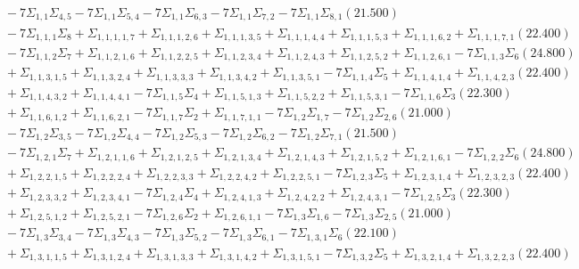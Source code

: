 \documentclass[12pt]{article}
\begin{document}
\begin{landscape}
\begin{align*}
		&\quad\quad -7\Sigma_{1,1}\Sigma_{4,5}-7\Sigma_{1,1}\Sigma_{5,4}-7\Sigma_{1,1}\Sigma_{6,3}-7\Sigma_{1,1}\Sigma_{7,2}-7\Sigma_{1,1}\Sigma_{8,1}(21.500) \\ 
		&\quad\quad -7\Sigma_{1,1,1}\Sigma_{8}+\Sigma_{1,1,1,1,7}+\Sigma_{1,1,1,2,6}+\Sigma_{1,1,1,3,5}+\Sigma_{1,1,1,4,4}+\Sigma_{1,1,1,5,3}+\Sigma_{1,1,1,6,2}+\Sigma_{1,1,1,7,1}(22.400) \\ 
		&\quad\quad -7\Sigma_{1,1,2}\Sigma_{7}+\Sigma_{1,1,2,1,6}+\Sigma_{1,1,2,2,5}+\Sigma_{1,1,2,3,4}+\Sigma_{1,1,2,4,3}+\Sigma_{1,1,2,5,2}+\Sigma_{1,1,2,6,1}-7\Sigma_{1,1,3}\Sigma_{6}(24.800) \\ 
		&\quad\quad +\Sigma_{1,1,3,1,5}+\Sigma_{1,1,3,2,4}+\Sigma_{1,1,3,3,3}+\Sigma_{1,1,3,4,2}+\Sigma_{1,1,3,5,1}-7\Sigma_{1,1,4}\Sigma_{5}+\Sigma_{1,1,4,1,4}+\Sigma_{1,1,4,2,3}(22.400) \\ 
		&\quad\quad +\Sigma_{1,1,4,3,2}+\Sigma_{1,1,4,4,1}-7\Sigma_{1,1,5}\Sigma_{4}+\Sigma_{1,1,5,1,3}+\Sigma_{1,1,5,2,2}+\Sigma_{1,1,5,3,1}-7\Sigma_{1,1,6}\Sigma_{3}(22.300) \\ 
		&\quad\quad +\Sigma_{1,1,6,1,2}+\Sigma_{1,1,6,2,1}-7\Sigma_{1,1,7}\Sigma_{2}+\Sigma_{1,1,7,1,1}-7\Sigma_{1,2}\Sigma_{1,7}-7\Sigma_{1,2}\Sigma_{2,6}(21.000) \\ 
		&\quad\quad -7\Sigma_{1,2}\Sigma_{3,5}-7\Sigma_{1,2}\Sigma_{4,4}-7\Sigma_{1,2}\Sigma_{5,3}-7\Sigma_{1,2}\Sigma_{6,2}-7\Sigma_{1,2}\Sigma_{7,1}(21.500) \\ 
		&\quad\quad -7\Sigma_{1,2,1}\Sigma_{7}+\Sigma_{1,2,1,1,6}+\Sigma_{1,2,1,2,5}+\Sigma_{1,2,1,3,4}+\Sigma_{1,2,1,4,3}+\Sigma_{1,2,1,5,2}+\Sigma_{1,2,1,6,1}-7\Sigma_{1,2,2}\Sigma_{6}(24.800) \\ 
		&\quad\quad +\Sigma_{1,2,2,1,5}+\Sigma_{1,2,2,2,4}+\Sigma_{1,2,2,3,3}+\Sigma_{1,2,2,4,2}+\Sigma_{1,2,2,5,1}-7\Sigma_{1,2,3}\Sigma_{5}+\Sigma_{1,2,3,1,4}+\Sigma_{1,2,3,2,3}(22.400) \\ 
		&\quad\quad +\Sigma_{1,2,3,3,2}+\Sigma_{1,2,3,4,1}-7\Sigma_{1,2,4}\Sigma_{4}+\Sigma_{1,2,4,1,3}+\Sigma_{1,2,4,2,2}+\Sigma_{1,2,4,3,1}-7\Sigma_{1,2,5}\Sigma_{3}(22.300) \\ 
		&\quad\quad +\Sigma_{1,2,5,1,2}+\Sigma_{1,2,5,2,1}-7\Sigma_{1,2,6}\Sigma_{2}+\Sigma_{1,2,6,1,1}-7\Sigma_{1,3}\Sigma_{1,6}-7\Sigma_{1,3}\Sigma_{2,5}(21.000) \\ 
		&\quad\quad -7\Sigma_{1,3}\Sigma_{3,4}-7\Sigma_{1,3}\Sigma_{4,3}-7\Sigma_{1,3}\Sigma_{5,2}-7\Sigma_{1,3}\Sigma_{6,1}-7\Sigma_{1,3,1}\Sigma_{6}(22.100) \\ 
		&\quad\quad +\Sigma_{1,3,1,1,5}+\Sigma_{1,3,1,2,4}+\Sigma_{1,3,1,3,3}+\Sigma_{1,3,1,4,2}+\Sigma_{1,3,1,5,1}-7\Sigma_{1,3,2}\Sigma_{5}+\Sigma_{1,3,2,1,4}+\Sigma_{1,3,2,2,3}(22.400) \\ 

\end{align*}
\end{landscape}
\end{document}

